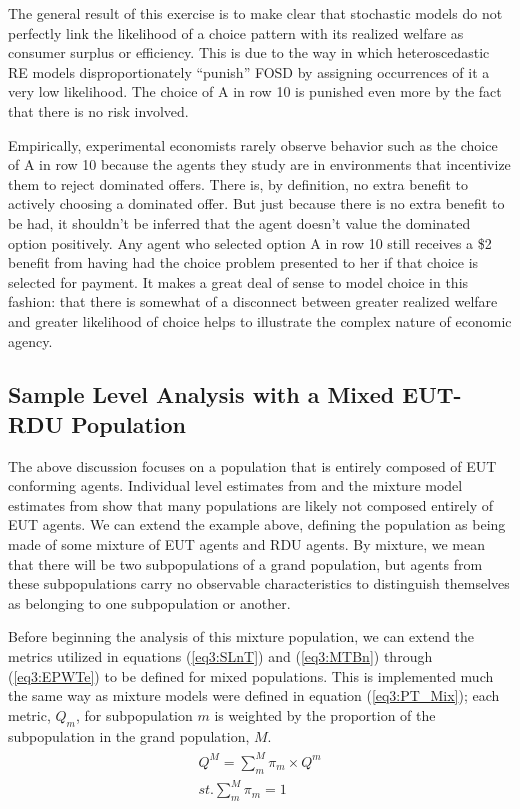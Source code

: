 \documentclass[../main.tex]{subfiles}
\begin{document}
The general result of this exercise is to make clear that stochastic models do not perfectly link the likelihood of a choice pattern with its realized welfare as consumer surplus or efficiency.
This is due to the way in which heteroscedastic RE models disproportionately \enquote{punish} FOSD by assigning occurrences of it a very low likelihood.
The choice of A in row 10 is punished even more by the fact that there is no risk involved.


Empirically, experimental economists rarely observe behavior such as the choice of A in row 10 because the agents they study are in environments that incentivize them to reject dominated offers.
There is, by definition, no extra benefit to actively choosing a dominated offer.
But just because there is no extra benefit to be had, it shouldn't be inferred that the agent doesn't value the dominated option positively.
Any agent who selected option A in row 10 still receives a \$2 benefit from having had the choice problem presented to her if that choice is selected for payment.
It makes a great deal of sense to model choice in this fashion: that there is somewhat of a disconnect between greater realized welfare and greater likelihood of choice helps to illustrate the complex nature of economic agency.

\subsection{Sample Level Analysis with a Mixed EUT-RDU Population}

The above discussion focuses on a population that is entirely composed of EUT conforming agents.
Individual level estimates from \textcite{Hey1994} and the mixture model estimates from \textcite{Harrison2008a} show that many populations are likely not composed entirely of EUT agents.
We can extend the example above, defining the population as being made of some mixture of EUT agents and RDU agents.
By mixture, we mean that there will be two subpopulations of a grand population, but agents from these subpopulations carry no observable characteristics to distinguish themselves as belonging to one subpopulation or another.

Before beginning the analysis of this mixture population, we can extend the metrics utilized in equations (\ref{eq3:SLnT}) and (\ref{eq3:MTBn}) through (\ref{eq3:EPWTe}) to be defined for mixed populations.
This is implemented much the same way as mixture models were defined in equation (\ref{eq3:PT_Mix}); each metric, $Q_m$, for subpopulation $m$ is weighted by the proportion of the subpopulation in the grand population, $M$.
\begin{align}
	\label{eq3:Metric_Mix}
	\begin{split}
		\bm{\mathit{Q^M}} = \sum_m^M \pi_m \times Q^m \\ 
		\mathit{st.} \sum_m^M \pi_m = 1
	\end{split}
\end{align}
\end{document}
